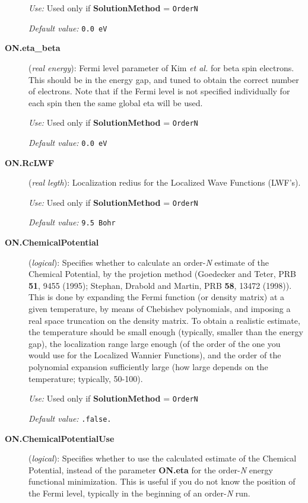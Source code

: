 \documentclass[11pt]{article}
\begin{document}
\begin{description}
{\it Use:} Used only if {\bf SolutionMethod} = {\tt OrderN}

{\it Default value:} {\tt 0.0 eV}

\item[{\bf ON.eta\_beta}] ({\it real energy}): 
Fermi level parameter of Kim {\it et al.} for beta spin electrons. 
This should be in the energy gap, and tuned to obtain
the correct number of electrons. Note that if the Fermi
level is not specified individually for each spin then the
same global eta will be used.

{\it Use:} Used only if {\bf SolutionMethod} = {\tt OrderN}

{\it Default value:} {\tt 0.0 eV}

\item[{\bf ON.RcLWF}] ({\it real legth}): 
Localization redius for the Localized Wave Functions (LWF's).

{\it Use:} Used only if  {\bf SolutionMethod} = {\tt OrderN}

{\it Default value:} {\tt 9.5 Bohr}
        
\item[{\bf ON.ChemicalPotential}] ({\it logical}): 
Specifies whether to calculate an order-{\it N} estimate of the
Chemical Potential, by the projetion method 
(Goedecker and Teter, PRB {\bf 51}, 9455 (1995); 
Stephan, Drabold and Martin, PRB {\bf 58}, 13472 
(1998)). This is
done by expanding the Fermi function (or density matrix)
at a given temperature, by means of Chebishev
polynomials, and imposing a
real space truncation on the density matrix.
To obtain a realistic estimate, the temperature 
should be small enough (typically, smaller than
the energy gap), the localization range large enough
(of the order of the one you would use for the Localized Wannier
Functions), and the order of the polynomial expansion
sufficiently large (how large depends on the temperature; 
typically, 50-100).

{\it Use:} Used only if {\bf SolutionMethod} = {\tt OrderN}

{\it Default value:} {\tt .false.}

\item[{\bf ON.ChemicalPotentialUse}] ({\it logical}): 
Specifies whether to use the calculated estimate of the
Chemical Potential, instead of the parameter 
{\bf ON.eta} 
for the order-{\it N} energy functional minimization.
This is useful if you do not know the position
of the Fermi level, typically in the beginning
of an order-{\em N} run.


\end{description}
\end{document}
